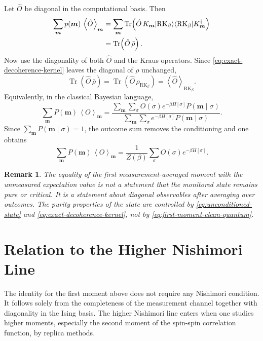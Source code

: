 \documentclass[11pt]{article}
\newcommand{\ket}[1]{\lvert #1\rangle}
\newcommand{\bra}[1]{\langle #1\rvert}
\newcommand{\avg}[1]{\left\langle #1 \right\rangle}
\DeclareMathOperator{\Tr}{Tr}
\newtheorem{remark}{Remark}
\begin{document}
Let $\hat O$ be diagonal in the computational basis. Then
\begin{align}
\sum_{\bm m} p(\bm m)\,\avg{\hat O}_{\bm m}
&=
\sum_{\bm m}
\Tr\!\left(
\hat O\, K_{\bm m}\ket{\mathrm{RK}_\beta}\bra{\mathrm{RK}_\beta}K_{\bm m}^\dagger
\right)
\notag\\
&=
\Tr\!\left(
\hat O\, \bar\rho
\right).
\label{eq:first-moment-rho-bar}
\end{align}
Now use the diagonality of both $\hat O$ and the Kraus operators. Since \eqref{eq:exact-decoherence-kernel} leaves the diagonal of $\rho$ unchanged,
\begin{equation}
\Tr(\hat O\,\bar\rho)
=
\Tr(\hat O\,\rho_{\mathrm{RK}_\beta})
=
\avg{\hat O}_{\mathrm{RK}_\beta}.
\label{eq:first-moment-clean-quantum}
\end{equation}
Equivalently, in the classical Bayesian language,
\begin{equation}
\sum_{\bm m} P(\bm m)\,\avg{O}_{\bm m}
=
\frac{
\sum_{\bm m}\sum_\sigma O(\sigma)e^{-\beta H[\sigma]}
P(\bm m\mid \sigma)
}{
\sum_{\bm m}\sum_\sigma e^{-\beta H[\sigma]}P(\bm m\mid \sigma)
}.
\end{equation}
Since $\sum_{\bm m}P(\bm m\mid \sigma)=1$, the outcome sum removes the conditioning and one obtains
\begin{equation}
\sum_{\bm m} P(\bm m)\,\avg{O}_{\bm m}
=
\frac{1}{Z(\beta)}\sum_\sigma O(\sigma)e^{-\beta H[\sigma]}.
\label{eq:first-moment-clean-classical}
\end{equation}

\begin{remark}
The equality of the first measurement-averaged moment with the unmeasured expectation value is \emph{not} a statement that the monitored state remains pure or critical. It is a statement about diagonal observables after averaging over outcomes. The purity properties of the state are controlled by \eqref{eq:unconditioned-state} and \eqref{eq:exact-decoherence-kernel}, not by \eqref{eq:first-moment-clean-quantum}.
\end{remark}

\section{Relation to the Higher Nishimori Line}

The identity for the first moment above does not require any Nishimori condition. It follows solely from the completeness of the measurement channel together with diagonality in the Ising basis. The higher Nishimori line enters when one studies higher moments, especially the second moment of the spin-spin correlation function, by replica methods.
\end{document}
